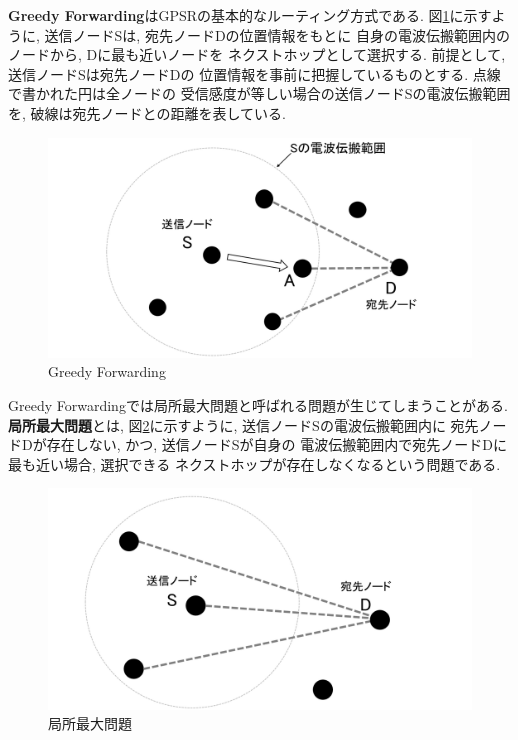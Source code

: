 \indent \textbf{Greedy Forwarding}はGPSRの基本的なルーティング方式である.
図\ref{fig:greedy}に示すように, 送信ノードSは, 宛先ノードDの位置情報をもとに
自身の電波伝搬範囲内のノードから, Dに最も近いノードを
ネクストホップとして選択する. 前提として, 送信ノードSは宛先ノードDの
位置情報を事前に把握しているものとする. 点線で書かれた円は全ノードの
受信感度が等しい場合の送信ノードSの電波伝搬範囲を, 
破線は宛先ノードとの距離を表している.

\begin{figure}
  \centering
  \includegraphics[scale=0.7]{figures/greedy.png}
  \caption{Greedy Forwarding}
  \label{fig:greedy}
\end{figure}

Greedy Forwardingでは局所最大問題と呼ばれる問題が生じてしまうことがある. 
\textbf{局所最大問題}とは, 図\ref{fig:local}に示すように, 送信ノードSの電波伝搬範囲内に
宛先ノードDが存在しない, かつ, 送信ノードSが自身の
電波伝搬範囲内で宛先ノードDに最も近い場合, 選択できる
ネクストホップが存在しなくなるという問題である.

\begin{figure}
  \centering
  \includegraphics[scale=0.6]{figures/local.png}
  \caption{局所最大問題}
  \label{fig:local}
\end{figure}
